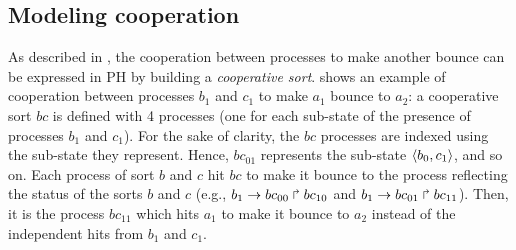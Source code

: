 \subsection{Modeling cooperation}
As described in \cite{PMR10-TCSB}, the cooperation between processes to make another bounce can be
expressed in PH by building a \emph{cooperative sort}.
 shows an example of cooperation between processes $b_1$ and $c_1$ to
make $a_1$ bounce to $a_2$:
a cooperative sort $bc$ is defined with 4 processes (one for each sub-state of the presence of
processes $b_1$ and $c_1$).
For the sake of clarity, the $bc$ processes are indexed using the sub-state they represent.
Hence, $bc_{01}$ represents the sub-state $\mbox{$\langle b_0,c_1 \rangle$}$, and so on.
Each process of sort $b$ and $c$ hit $bc$ to make it bounce to the process reflecting the status of the sorts $b$
and $c$ (e.g., $b_1\rightarrow bc_{00}\Rsh bc_{10}$ and $b_1\rightarrow bc_{01}\Rsh bc_{11}$).
Then, it is the process $bc_{11}$ which hits $a_1$ to make it bounce to $a_2$ instead of the
independent hits from $b_1$ and $c_1$.




